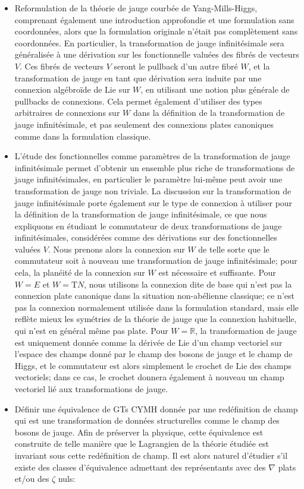 \documentclass[a4paper,twoside,11pt]{scrbook}
\theoremstyle{plain}
\theoremstyle{remark}
\theoremstyle{definition}
\begin{document}
\begin{itemize}
	\item Reformulation de la théorie de jauge courbée de Yang-Mills-Higgs, comprenant également une introduction approfondie et une formulation sans coordonnées, alors que la formulation originale n'était pas complètement sans coordonnées. En particulier, la transformation de jauge infinitésimale sera généralisée à une dérivation sur les fonctionnelle valuées des fibrés de vecteurs $V$. Ces fibrés de vecteurs $V$ seront le pullback d'un autre fibré $W$, et la transformation de jauge en tant que dérivation sera induite par une connexion algébroïde de Lie sur $W$, en utilisant une notion plus générale de pullbacks de connexions. Cela permet également d'utiliser des types arbitraires de connexions sur $W$ dans la définition de la transformation de jauge infinitésimale, et pas seulement des connexions plates canoniques comme dans la formulation classique.
	\item L'étude des fonctionnelles comme paramètres de la transformation de jauge infinitésimale permet d'obtenir un ensemble plus riche de transformations de jauge infinitésimales, en particulier le paramètre lui-même peut avoir une transformation de jauge non triviale. La discussion sur la transformation de jauge infinitésimale porte également sur le type de connexion à utiliser pour la définition de la transformation de jauge infinitésimale, ce que nous expliquons en étudiant le commutateur de deux transformations de jauge infinitésimales, considérées comme des dérivations sur des fonctionnelles valuées $V$. Nous prenons alors la connexion sur $W$ de telle sorte que le commutateur soit à nouveau une transformation de jauge infinitésimale; pour cela, la planéité de la connexion sur $W$ est nécessaire et suffisante. Pour $W= E$ et $W = \mathrm{T}N$, nous utilisons la connexion dite de base qui n'est pas la connexion plate canonique dans la situation non-abélienne classique; ce n'est pas la connexion normalement utilisée dans la formulation standard, mais elle reflète mieux les symétries de la théorie de jauge que la connexion habituelle, qui n'est en général même pas plate. Pour $W = \mathbb{R}$, la transformation de jauge est uniquement donnée comme la dérivée de Lie d'un champ vectoriel sur l'espace des champs donné par le champ des bosons de jauge et le champ de Higgs, et le commutateur est alors simplement le crochet de Lie des champs vectoriels; dans ce cas, le crochet donnera également à nouveau un champ vectoriel lié aux transformations de jauge.
	\item Définir une équivalence de GTs CYMH donnée par une redéfinition de champ qui est une transformation de données structurelles comme le champ des bosons de jauge. Afin de préserver la physique, cette équivalence est construite de telle manière que le Lagrangien de la théorie étudiée est invariant sous cette redéfinition de champ. Il est alors naturel d'étudier s'il existe des classes d'équivalence admettant des représentants avec des $\nabla$ plats et/ou des $\zeta$ nuls:

\end{itemize}
\end{document}
